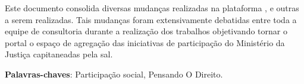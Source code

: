 \setlength{\absparsep}{18pt} %
\begin{resumo}
Este documento consolida diversas mudanças realizadas na plataforma \ppod, e outras a serem realizadas. Tais mudanças foram extensivamente debatidas entre toda a equipe de consultoria durante a realização dos trabalhos objetivando tornar o portal \ppod o espaço de agregação das iniciativas de participação do Ministério da Justiça capitaneadas pela \gls{sal}.

%
 \vfill
 \noindent
 \textbf{Palavras-chaves}: Participação social, Pensando O Direito.
 \vfill
\end{resumo}

